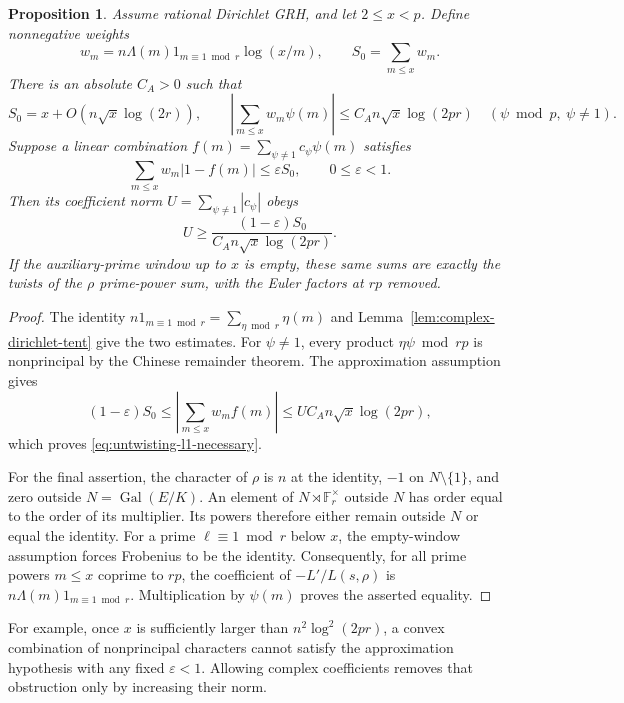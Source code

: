 \documentclass[11pt]{article}
\newtheorem{proposition}[theorem]{Proposition}
\theoremstyle{definition}
\theoremstyle{remark}
\begin{document}
\begin{proposition}\label{prop:absolute-untwisting-cost}
Assume rational Dirichlet GRH, and let \(2\leq x<p\).
Define nonnegative weights
\[
 w_m=n\Lambda(m)1_{m\equiv1\bmod r}\log(x/m),\qquad
 S_0=\sum_{m\leq x}w_m.
\]
There is an absolute \(C_A>0\) such that
\[
 S_0=x+O(n\sqrt x\log(2r)),\qquad
 \left|\sum_{m\leq x}w_m\psi(m)\right|
 \leq C_A n\sqrt x\log(2pr)
 \quad(\psi\bmod p,\ \psi\ne1).
\]
Suppose a linear combination
\(f(m)=\sum_{\psi\ne1}c_\psi\psi(m)\) satisfies
\[
 \sum_{m\leq x}w_m|1-f(m)|\leq\varepsilon S_0,
 \qquad 0\leq\varepsilon<1.
\]
Then its coefficient norm \(U=\sum_{\psi\ne1}|c_\psi|\) obeys
\begin{equation}\label{eq:untwisting-l1-necessary}
 U\geq
 \frac{(1-\varepsilon)S_0}
 {C_A n\sqrt x\log(2pr)}.
\end{equation}
If the auxiliary-prime window up to \(x\) is empty, these same
sums are exactly the twists of the \(\rho\) prime-power sum,
with the Euler factors at \(rp\) removed.
\end{proposition}
\begin{proof}
The identity
\(n1_{m\equiv1\bmod r}=\sum_{\eta\bmod r}\eta(m)\)
and Lemma~\ref{lem:complex-dirichlet-tent} give the two estimates.
For \(\psi\ne1\), every product \(\eta\psi\bmod rp\) is
nonprincipal by the Chinese remainder theorem.
The approximation assumption gives
\[
 (1-\varepsilon)S_0
 \leq\left|\sum_{m\leq x}w_m f(m)\right|
 \leq U C_A n\sqrt x\log(2pr),
\]
which proves \eqref{eq:untwisting-l1-necessary}.

For the final assertion, the character of \(\rho\) is \(n\) at
the identity, \(-1\) on \(N\setminus\{1\}\), and zero outside
\(N=\operatorname{Gal}(E/K)\). An element of
\(N\rtimes\mathbb F_r^\times\) outside \(N\) has order equal to
the order of its multiplier. Its powers therefore either remain
outside \(N\) or equal the identity. For a prime
\(\ell\equiv1\bmod r\) below \(x\), the empty-window assumption
forces Frobenius to be the identity. Consequently, for all prime
powers \(m\leq x\) coprime to \(rp\), the coefficient of
\(-L'/L(s,\rho)\) is
\(n\Lambda(m)1_{m\equiv1\bmod r}\).
Multiplication by \(\psi(m)\) proves the asserted equality.
\end{proof}

For example, once \(x\) is sufficiently larger than
\(n^2\log^2(2pr)\), a convex combination of nonprincipal
characters cannot satisfy the approximation hypothesis with any
fixed \(\varepsilon<1\). Allowing complex coefficients removes
that obstruction only by increasing their norm.
\end{document}
